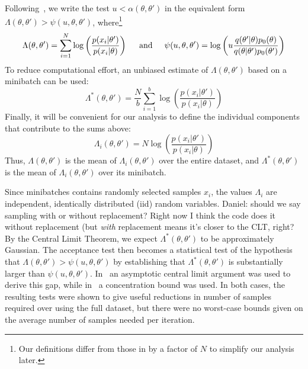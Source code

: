 \documentclass{article}
\begin{document}
Following~\cite{icml2014c1_bardenet14}, we write the test $u <
\alpha(\theta,\theta')$ in the equivalent form $\Lambda(\theta,\theta') >
\psi(u,\theta,\theta')$, where\footnote{Our definitions differ from those in
\cite{icml2014c1_bardenet14} by a factor of $N$ to simplify our analysis later.}
\begin{equation}
\Lambda(\theta,\theta') = \sum_{i=1}^N \log\left(\frac{p(x_i|\theta')}{p(x_i|\theta)}\right)  
\hspace{0.2in} {\rm and} \hspace{0.2in}
\psi(u,\theta,\theta') = \log\left(u\frac{q(\theta'|\theta)p_0(\theta)}{q(\theta|\theta')p_0(\theta')}\right)
\end{equation}
To reduce computational effort, an unbiased estimate of $\Lambda(\theta,\theta')$
based on a minibatch can be used:
\begin{equation}
\Lambda^*(\theta,\theta') = \frac{N}{b}\sum_{i=1}^b \log\left(\frac{p(x_i|\theta')}{p(x_i|\theta)}\right)  
\end{equation}
Finally, it will be convenient for our analysis to define the individual
components that contribute to the sums above:
\begin{equation}\label{eq:individual_terms}
\Lambda_i(\theta,\theta') = N \log\left(\frac{p(x_i|\theta')}{p(x_i|\theta)}\right)  
\end{equation}
Thus, $\Lambda(\theta,\theta')$ is the mean of $\Lambda_i(\theta,\theta')$ over
the entire dataset, and $\Lambda^*(\theta,\theta')$ is the mean of
$\Lambda_i(\theta,\theta')$ over its minibatch. 

Since minibatches contains randomly selected samples $x_i$, the values
$\Lambda_i$ are independent, identically distributed (iid) random variables.
{\color{blue} Daniel: should we say sampling with or without replacement? Right
now I think the code does it without replacement (but \emph{with} replacement
means it's closer to the CLT, right?} By the Central Limit Theorem, we expect
$\Lambda^*(\theta,\theta')$ to be approximately Gaussian. The acceptance test
then becomes a statistical test of the hypothesis that
$\Lambda(\theta,\theta')>\psi(u,\theta,\theta')$ by establishing that
$\Lambda^*(\theta,\theta')$ is substantially larger than
$\psi(u,\theta,\theta')$.  In~\cite{cutting_mh_2014} an asymptotic central limit
argument was used to derive this gap, while in~\cite{icml2014c1_bardenet14} a
concentration bound was used. In both cases, the resulting tests were shown to
give useful reductions in number of samples required over using the full
dataset, but there were no worst-case bounds given on the average number of
samples needed per iteration.
\end{document}
